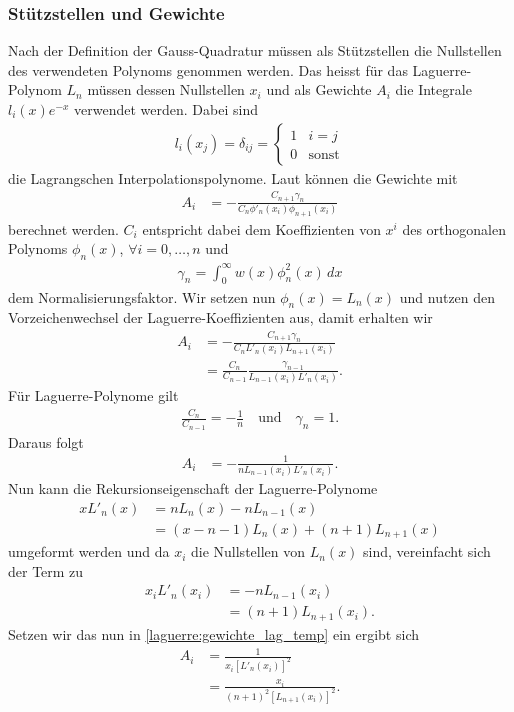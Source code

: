 \subsubsection{Stützstellen und Gewichte}
Nach der Definition der Gauss-Quadratur müssen als Stützstellen die Nullstellen
des verwendeten Polynoms genommen werden.
Das heisst für das Laguerre-Polynom $L_n$ müssen dessen Nullstellen $x_i$ und
als Gewichte $A_i$ die Integrale $l_i(x)e^{-x}$ verwendet werden.
Dabei sind
\begin{align*}
l_i(x_j)
=
\delta_{ij}
=
\begin{cases}
1 & i=j      \\
0 & \text{sonst}
\end{cases}
\end{align*}
die Lagrangschen Interpolationspolynome.
Laut \cite{laguerre:hildebrand2013introduction} können die Gewichte mit
\begin{align*}
A_i
 & =
-\frac{C_{n+1} \gamma_n}{C_n \phi'_n(x_i) \phi_{n+1} (x_i)}
\end{align*}
berechnet werden.
$C_i$ entspricht dabei dem Koeffizienten von $x^i$
des orthogonalen Polynoms $\phi_n(x)$, $\forall i =0,\ldots,n$ und
\begin{align*}
\gamma_n
=
\int_0^\infty w(x) \phi_n^2(x)\,dx
\end{align*}
dem Normalisierungsfaktor.
Wir setzen nun $\phi_n(x) = L_n(x)$ und
nutzen den Vorzeichenwechsel der Laguerre-Koeffizienten aus,
damit erhalten wir
\begin{align*}
A_i
 & =
-\frac{C_{n+1} \gamma_n}{C_n L'_n(x_i) L_{n+1} (x_i)}
\\
 & = \frac{C_n}{C_{n-1}} \frac{\gamma_{n-1}}{L_{n-1}(x_i) L'_n(x_i)}
.
\end{align*}
Für Laguerre-Polynome gilt
\begin{align*}
\frac{C_n}{C_{n-1}}
=
-\frac{1}{n}
\quad \text{und} \quad
\gamma_n
=
1
.
\end{align*}
Daraus folgt
\begin{align}
A_i
&=
- \frac{1}{n L_{n-1}(x_i) L'_n(x_i)}
.
\label{laguerre:gewichte_lag_temp}
\end{align}
Nun kann die Rekursionseigenschaft der Laguerre-Polynome
\begin{align*}
x L'_n(x) 
&= 
n L_n(x) - n L_{n-1}(x)
\\
&= (x - n - 1) L_n(x) + (n + 1) L_{n+1}(x)
\end{align*}
umgeformt werden und da $x_i$ die Nullstellen von $L_n(x)$ sind,
vereinfacht sich der Term zu
\begin{align*}
x_i L'_n(x_i)
&=
- n L_{n-1}(x_i) 
\\
&=
 (n + 1) L_{n+1}(x_i)
.
\end{align*}
Setzen wir das nun in \eqref{laguerre:gewichte_lag_temp} ein ergibt sich
\begin{align}
\nonumber
A_i
&=
\frac{1}{x_i \left[ L'_n(x_i) \right]^2}
\\
&=
\frac{x_i}{(n+1)^2 \left[ L_{n+1}(x_i) \right]^2}
.
\label{laguerre:quadratur_gewichte}
\end{align}

